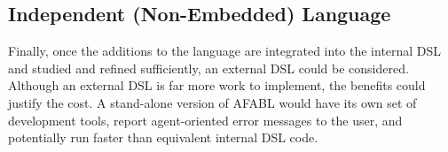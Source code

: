 \subsection{Independent (Non-Embedded) Language}\label{sec:conclusion-full-language}

Finally, once the additions to the language are integrated into the internal DSL and studied and refined sufficiently, an external DSL could be considered. Although an external DSL is far more work to implement, the benefits could justify the cost. A stand-alone version of AFABL would have its own set of development tools, report agent-oriented error messages to the user, and potentially run faster than equivalent internal DSL code.
